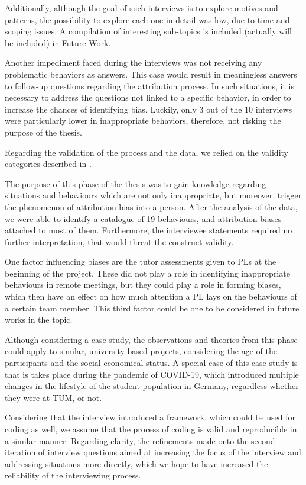 Additionally, although the goal of such interviews is to explore motives and patterns, the possibility to explore each one in detail was low, due to time and scoping issues. A compilation of interesting sub-topics is included (actually will be included) in Future Work.

Another impediment faced during the interviews was not receiving any problematic behaviors as answers. This case would result in meaningless answers to follow-up questions regarding the attribution process. In such situations, it is necessary to address the questions not linked to a specific behavior, in order to increase the chances of identifying bias. Luckily, only 3 out of the 10 interviews were particularly lower in inappropriate behaviors, therefore, not risking the purpose of the thesis.

Regarding the validation of the process and the data, we relied on the validity categories described in \cite{Runeson2012}.

The purpose of this phase of the thesis was to gain knowledge regarding situations and behaviours which are not only inappropriate, but moreover, trigger the phenomenon of attribution bias into a person. After the analysis of the data, we were able to identify a catalogue of 19 behaviours, and attribution biases attached to most of them. Furthermore, the interviewee statements required no further interpretation, that would threat the construct validity.

One factor influencing biases are the tutor assessments given to PLs at the beginning of the project. These did not play a role in identifying inappropriate behaviours in remote meetings, but they could play a role in forming biases, which then have an effect on how much attention a PL lays on the behaviours of a certain team member. This third factor could be one to be considered in future works in the topic.

Although considering a case study, the observations and theories from this phase could apply to similar, university-based projects, considering the age of the participants and the social-economical status. A special case of this case study is that is takes place during the pandemic of COVID-19, which introduced multiple changes in the lifestyle of the student population in Germany, regardless whether they were at TUM, or not.

Considering that the interview introduced a framework, which could be used for coding as well, we assume that the process of coding is valid and reproducible in a similar manner. Regarding clarity, the refinements made onto the second iteration of interview questions aimed at increasing the focus of the interview and addressing situations more directly, which we hope to have increased the reliability of the interviewing process.  